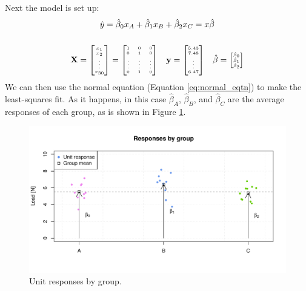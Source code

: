 \documentclass[11pt,a4paper,article]{memoir} %
\begin{document}
Next the model is set up:
\begin{gather}
	\hat{y} = \hat{\beta}_0 x_A + \hat{\beta}_{1}x_B + \hat{\beta}_{2}x_C = x \hat{\beta} \label{eq:categorical_regression} \\[5mm]
	\mathbf{X} = 
		{\tiny
			\begin{bmatrix}
				x_1 \\ x_2 \\ \vdots \\ x_{30}
			\end{bmatrix}
			=
			\begin{bmatrix}
				 1 & 0 & 0 \\  0 & 1 & 0 \\ \vdots & \vdots & \vdots \\ 0 & 1 & 0
			\end{bmatrix}}
	\quad \mathbf{y} = {\tiny \begin{bmatrix} 5.43 \\ 7.48 \\ \vdots \\ 6.47 \end{bmatrix}}
	\quad \hat{\beta} = {\tiny \begin{bmatrix} \hat{\beta}_0 \\ \hat{\beta}_1 \\ \hat{\beta}_2 \end{bmatrix}}
\end{gather}
We can then use the normal equation (Equation \ref{eq:normal_eqtn}) to make the least-squares fit. As it happens, in this case $\hat{\beta}_A$, $\hat{\beta}_B$, and $\hat{\beta}_C$ are the average responses of each group, as is shown in Figure \ref{fig:categorical_regression}.
\begin{figure}[h]
\includegraphics[width=\textwidth]{categorical_regression.pdf}
\caption{Unit responses by group.}
\label{fig:categorical_regression}
\end{figure}
\end{document}
